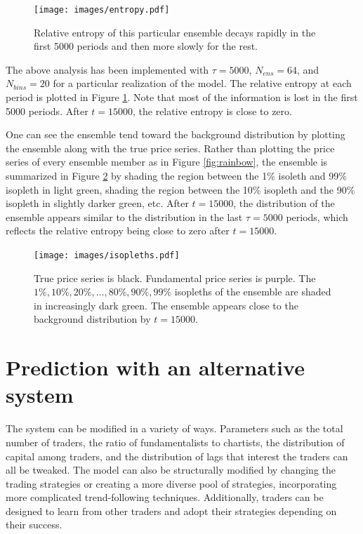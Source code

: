 \documentclass{article}
\begin{document}
\begin{figure}
  \centering
  \texttt{[image: images/entropy.pdf]}
  \caption{Relative entropy of this particular ensemble decays rapidly in the first 5000 periods and then more slowly for the rest.}
  \label{fig:entropy}
  \vspace{-20pt}
\end{figure}
The above analysis has been implemented with $\tau=5000$, $N_{ens}=64$, and $N_{bins}=20$ for a particular realization of the model. The relative entropy at each period is plotted in Figure \ref{fig:entropy}. Note that most of the information is lost in the first 5000 periods. After $t=15000$, the relative entropy is close to zero.

One can see the ensemble tend toward the background distribution by plotting the ensemble along with the true price series. Rather than plotting the price series of every ensemble member as in Figure \ref{fig:rainbow}, the ensemble is summarized in Figure \ref{fig:isopleths} by shading the region between the 1\% isoleth and 99\% isopleth in light green, shading the region between the 10\% isopleth and the 90\% isopleth in slightly darker green, etc. After $t=15000$, the distribution of the ensemble appears similar to the distribution in the last $\tau=5000$ periods, which reflects the relative entropy being close to zero after $t=15000$.

\begin{figure}[h]
  \centering
  \texttt{[image: images/isopleths.pdf]}
  \caption{True price series is black. Fundamental price series is purple. The $1\%, 10\%, 20\%, \ldots, 80\%, 90\%, 99\%$ isopleths of the ensemble are shaded in increasingly dark green. The ensemble appears close to the background distribution by $t=15000$.}
  \label{fig:isopleths}
\end{figure}

\section{Prediction with an alternative system}

The system can be modified in a variety of ways. Parameters such as the total number of traders, the ratio of fundamentalists to chartists, the distribution of capital among traders, and the distribution of lags that interest the traders can all be tweaked. The model can also be structurally modified by changing the trading strategies or creating a more diverse pool of strategies, incorporating more complicated trend-following techniques. Additionally, traders can be designed to learn from other traders and adopt their strategies depending on their success.
\end{document}
